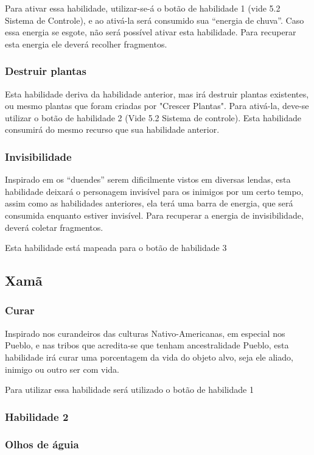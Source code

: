 Para ativar essa habilidade, utilizar-se-á o botão de habilidade 1 (vide 5.2 Sistema de Controle), e ao ativá-la será consumido sua ``energia de chuva''. Caso essa energia se esgote, não será possível ativar esta habilidade. Para recuperar esta energia ele deverá recolher fragmentos.


\subsubsection{Destruir plantas}
Esta habilidade deriva da habilidade anterior, mas irá destruir plantas existentes, ou mesmo plantas que foram criadas por "Crescer Plantas". Para ativá-la, deve-se utilizar o botão de habilidade 2 (Vide 5.2 Sistema de controle). Esta  habilidade consumirá do mesmo recurso que sua habilidade anterior. 


\subsubsection{Invisibilidade}
Inspirado em os ``duendes'' serem dificilmente vistos em diversas lendas, esta habilidade deixará o personagem invisível para os inimigos por um certo tempo, assim como as habilidades anteriores, ela terá uma barra de energia, que será consumida enquanto estiver invisível. Para recuperar a energia de invisibilidade, deverá coletar fragmentos.

Esta habilidade está mapeada para o botão de habilidade 3 



\subsection{Xamã}
\subsubsection{Curar}
Inspirado nos curandeiros das culturas Nativo-Americanas, em especial nos Pueblo, e nas tribos que acredita-se que tenham ancestralidade Pueblo, esta habilidade irá curar uma porcentagem da vida do objeto alvo, seja ele aliado, inimigo ou outro ser com vida.

Para utilizar essa habilidade será utilizado o botão de habilidade 1

\subsubsection{Habilidade 2}

\subsubsection{Olhos de águia}

